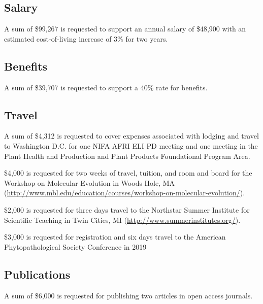 \documentclass[12pt,letterpaper]{article}
\title{\ruleline{Budget Justification}}
\begin{document}
\maketitle

\subsection{Salary}

A sum of \$99,267 is requested to support an annual salary of \$48,900 with an estimated cost-of-living increase of 3\% for two years.

\subsection{Benefits}

A sum of \$39,707 is requested to support a 40\% rate for benefits.

\subsection{Travel}

A sum of \$4,312 is requested to cover expenses associated with lodging and travel to Washington D.C. for one NIFA AFRI ELI PD meeting and one meeting in the Plant Health and Production and Plant Products Foundational Program Area.

\$4,000 is requested for two weeks of travel, tuition, and room and board for the Workshop on Molecular Evolution in Woods Hole, MA\\
(\url{http://www.mbl.edu/education/courses/workshop-on-molecular-evolution/}).

\$2,000 is requested for three days travel to the Northstar Summer Institute for Scientific Teaching in Twin Cities, MI (\url{http://www.summerinstitutes.org/}).

\$3,000 is requested for registration and six days travel to the American Phytopathological Society Conference in 2019

\subsection{Publications}

A sum of \$6,000 is requested for publishing two articles in open access journals.
\end{document}
